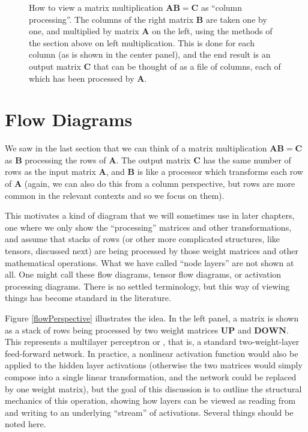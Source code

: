 \begin{figure}[h]
\centering
{}
\caption[Jeff Yoshimi.]{How to view a matrix multiplication  $\mathbf{A}\mathbf{B} = \mathbf{C}$ as ``column processing''. The columns of the right matrix $\mathbf{B}$ are taken one by one, and multiplied by matrix $\mathbf{A}$  on the left, using the methods of the section above on left multiplication. This is done for each column (as is shown in the center panel), and the end result is an output matrix $\mathbf{C}$ that can be thought of as a file of columns, each of which has been processed by $\mathbf{A}$.}
\label{columnPerspective}
\end{figure} 

\section{Flow Diagrams }\label{flowDiagrams}

We saw in the last section that we can think of a matrix multiplication $\mathbf{A}\mathbf{B} = \mathbf{C}$ as  $\mathbf{B}$ processing the rows of $\mathbf{A}$. The output matrix $\mathbf{C}$ has the same number of rows as the input matrix  $\mathbf{A}$, and $\mathbf{B}$  is like a processor which transforms each row of  $\mathbf{A}$ (again, we can also do this from a column perspective, but rows are more common in the relevant contexts and so we focus on them). 

This motivates a kind of diagram that we will sometimes use in later chapters, one where we only show the ``processing'' matrices and other transformations, and assume that stacks of rows (or other more complicated structures, like tensors, discussed next) are being processed by those weight matrices and other mathematical operations. What we have called ``node layers'' are not shown at all. One might call these flow diagrams, tensor flow diagrams, or activation processing diagrams. There is no settled terminology, but this way of viewing things has become standard in the literature.

Figure \ref{flowPerspective} illustrates the idea. In the left panel, a matrix is shown as a stack of rows being processed by two weight matrices $\mathbf{UP}$ and $\mathbf{DOWN}$. This represents a multilayer perceptron or , that is, a standard two-weight-layer feed-forward network. In practice, a nonlinear activation function would also be applied to the hidden layer activations (otherwise the two matrices would simply compose into a single linear transformation, and the network could be replaced by one weight matrix), but the goal of this discussion is to outline the structural mechanics of this operation, showing how layers can be viewed as reading from and writing to an underlying ``stream'' of activations. Several things should be noted here.


